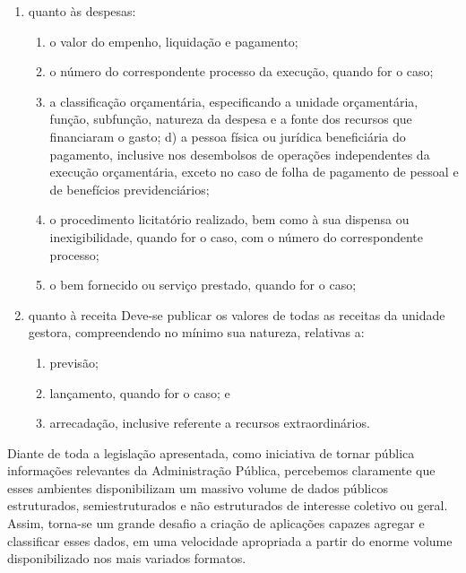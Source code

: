 \begin{enumerate}[label=(\roman*)]
	\item quanto às despesas:
	\begin{enumerate}
		\item o valor do empenho, liquidação e pagamento;  
		
		\item o número do correspondente processo da execução, quando for o caso;  
		
		\item a classificação orçamentária, especificando a unidade orçamentária, função, subfunção, natureza da despesa e a fonte dos recursos que financiaram o gasto; d) a pessoa física ou jurídica beneficiária do pagamento, inclusive nos desembolsos de operações independentes da execução orçamentária, exceto no caso de folha de pagamento de pessoal e de benefícios previdenciários;  
		
		\item o procedimento licitatório realizado, bem como à sua dispensa ou inexigibilidade, quando for o caso, com o número do correspondente processo;  
		
		\item o bem fornecido ou serviço prestado, quando for o caso; 
	\end{enumerate}

	\item quanto à receita
	Deve-se publicar os valores de todas as receitas da unidade gestora, compreendendo no mínimo sua natureza, relativas a:  
	\begin{enumerate}
		\item previsão;  
		
		\item lançamento, quando for o caso; e  
		
		\item arrecadação, inclusive referente a recursos extraordinários. \cite{guiaTransparencia2013}  
	\end{enumerate}
\end{enumerate}

Diante de toda a legislação apresentada, como iniciativa de tornar pública informações relevantes da Administração Pública, percebemos claramente que esses ambientes disponibilizam um massivo volume de dados públicos estruturados, semiestruturados e não estruturados de interesse coletivo ou geral. Assim, torna-se um grande desafio a criação de aplicações capazes agregar e classificar esses dados, em uma velocidade apropriada a partir do enorme volume disponibilizado nos mais variados formatos.  

